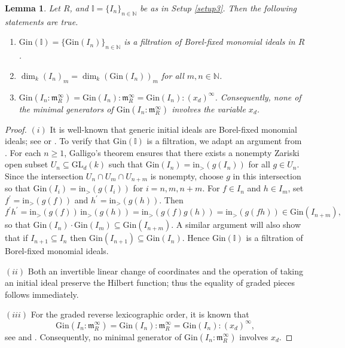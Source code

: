 \documentclass[12pt,a4paper]{amsart}
\theoremstyle{plain}
\newtheorem{lemma}[theorem]{Lemma}
\theoremstyle{definition}
\numberwithin{equation}{theorem}
\newcommand{\mm}{\mathfrak{m}}
\begin{document}
\begin{lemma}\label{generic_lemma}
Let $R$, and $\mathbb{I}=\{I_n\}_{n\in\mathbb{N}}$ be as in Setup \ref{setup3}. Then the following statements are true.
\begin{enumerate}[$(i)$]
 \item $\mathrm{Gin}(\mathbb{I}) = \{\mathrm{Gin}(I_n)\}_{n\in\mathbb{N}}$ is a filtration of Borel-fixed monomial ideals in $R$.
 \item $\dim_k {\left(I_n\right)}_m = \dim_k {\left(\mathrm{Gin}(I_n)\right)}_m$ for all $m,n\in \mathbb{N}$.
 \item $\mathrm{Gin}\left(I_n \colon \mm_R^{\infty}\right) = \mathrm{Gin}(I_n) \colon \mm_R^{\infty} = \mathrm{Gin}(I_n) \colon (x_d)^{\infty}$. Consequently, none of the minimal generators of $\mathrm{Gin}\left(I_n \colon \mm_R^{\infty}\right)$ involves the variable $x_d$.
\end{enumerate}
\end{lemma}
\begin{proof}
\textit{$(i)$}\;
It is well-known that generic initial ideals are Borel-fixed monomial ideals; see \cite[Theorem 1.27]{Gre98} or \cite[Theorem 15.20]{eisenbud}. To verify that $\mathrm{Gin}(\mathbb{I})$ is a filtration, we adapt an argument from \cite[Lemma 2.12]{May14}. For each $n \ge 1$, Galligo's theorem \cite[Theorem 1.27]{Gre98} ensures that there exists a nonempty Zariski open subset $U_n \subseteq \mathrm{GL}_d(k)$ such that $\mathrm{Gin}(I_n) = \mathrm{in}_>(g(I_n))$ for all $g \in U_n$.
Since the intersection $U_n \cap U_m \cap U_{n+m}$ is nonempty, choose $g$ in this intersection so that $\mathrm{Gin}(I_i) = \mathrm{in}_>(g(I_i))$ for $i=n,m,n+m$. For $f \in I_n$ and $h \in I_m$, set $f^{\prime} = \mathrm{in}_>(g(f))$ and $h^{\prime} = \mathrm{in}_>(g(h))$. Then
\[
    f^{\prime} h^{\prime} = \mathrm{in}_>(g(f))\, \mathrm{in}_>(g(h)) = \mathrm{in}_>(g(f)g(h))
    = \mathrm{in}_>(g(fh)) \in \mathrm{Gin}(I_{n+m}),
\]
so that $\mathrm{Gin}(I_n) \cdot \mathrm{Gin}(I_m) \subseteq \mathrm{Gin}(I_{n+m})$. A similar argument will also show that if $I_{n+1} \subseteq I_n$ then $\mathrm{Gin}(I_{n+1}) \subseteq \mathrm{Gin}(I_n)$. Hence $\mathrm{Gin}(\mathbb{I})$ is a filtration of Borel-fixed monomial ideals.

\textit{$(ii)$}\; Both an invertible linear change of coordinates and the operation of taking an initial ideal preserve the Hilbert function; thus the equality of graded pieces follows immediately.

\textit{$(iii)$}\; For the graded reverse lexicographic order, it is known that
\[
    \mathrm{Gin}(I_n \colon \mm_R^{\infty})
    = \mathrm{Gin}(I_n) \colon \mm_R^{\infty}
    = \mathrm{Gin}(I_n) \colon (x_d)^{\infty},
\]
see \cite[Proposition 2.21]{Gre98} and \cite[Proposition 15.24]{eisenbud}.
Consequently, no minimal generator of $\mathrm{Gin}(I_n \colon \mm_R^{\infty})$ involves $x_d$.
\end{proof}
\end{document}

